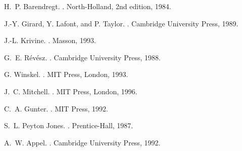 \documentclass{article}
\begin{document}
\renewcommand{\refname}{\vspace{-5ex}}

\begin{thebibliography}{1}

H.~P. Barendregt.
.
\newblock North-Holland, 2nd edition, 1984.


J.-Y. Girard, Y. Lafont, and P. Taylor.
.
\newblock Cambridge University Press, 1989.

J.-L. Krivine.
.
\newblock Masson, 1993.

G.~E. R\'ev\'esz.
.
\newblock Cambridge University Press, 1988.

G. Winskel.
. 
\newblock MIT Press, London, 1993.

J.~C. Mitchell.
.
\newblock MIT Press, London, 1996.

C.~A. Gunter.
.
\newblock MIT Press, 1992.

S.~L. Peyton Jones.
.
\newblock Prentice-Hall, 1987.

A.~W. Appel.
.
\newblock Cambridge University Press, 1992.

\end{thebibliography}
\end{document}
